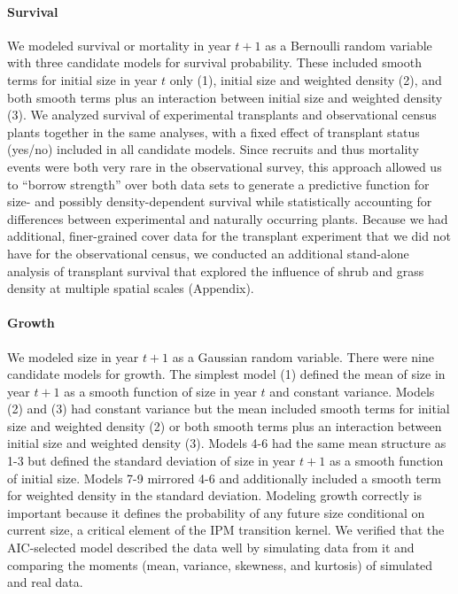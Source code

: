 \documentclass[11pt]{article}\usepackage[]{graphicx}\usepackage[usenames,dvipsnames]{xcolor}
\begin{document}
\paragraph{Survival}
We modeled survival or mortality in year $t+1$ as a Bernoulli random variable with three candidate models for survival probability.
These included smooth terms for initial size in year $t$ only (1), initial size and weighted density (2), and both smooth terms plus an interaction between initial size and weighted density (3). 
We analyzed survival of experimental transplants and observational census plants together in the same analyses, with a fixed effect of transplant status (yes/no) included in all candidate models. 
Since recruits and thus mortality events were both very rare in the observational survey, this approach allowed us to ``borrow strength'' over both data sets to generate a predictive function for size- and possibly density-dependent survival while statistically accounting for differences between experimental and naturally occurring plants. 
Because we had additional, finer-grained cover data for the transplant experiment that we did not have for the observational census, we conducted an additional stand-alone analysis of transplant survival that explored the influence of shrub and grass density at multiple spatial scales (Appendix).

\paragraph{Growth}
We modeled size in year $t+1$ as a Gaussian random variable. 
There were nine candidate models for growth.
The simplest model (1) defined the mean of size in year $t+1$ as a smooth function of size in year $t$ and constant variance. 
Models (2) and (3) had constant variance but the mean included smooth terms for initial size and weighted density (2) or both smooth terms plus an interaction between initial size and weighted density (3).
Models 4-6 had the same mean structure as 1-3 but defined the standard deviation of size in year $t+1$ as a smooth function of initial size. 
Models 7-9 mirrored 4-6 and additionally included a smooth term for weighted density in the standard deviation. 
Modeling growth correctly is important because it defines the probability of any future size conditional on current size, a critical element of the IPM transition kernel.
We verified that the AIC-selected model described the data well by simulating data from it and comparing the moments (mean, variance, skewness, and kurtosis) of simulated and real data.
\end{document}

